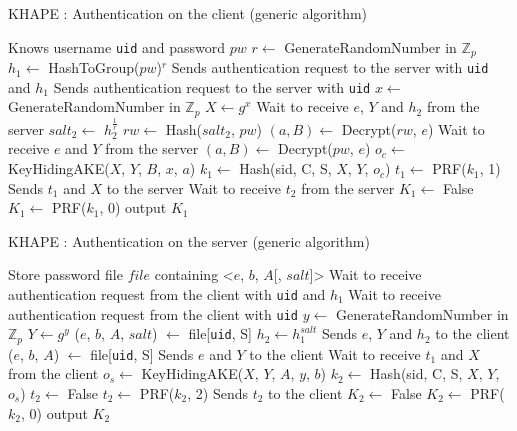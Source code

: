 ﻿\documentclass[../report.tex]{subfiles}
\begin{document}
\begin{algorithm}[h]
\caption{KHAPE : Authentication on the client (generic algorithm)}
\label{alg:login_client}
\begin{algorithmic}
\Require Knows username \verb|uid| and password $pw$
    \State $r \gets$ GenerateRandomNumber in $\mathbb{Z}_p$
    \State $h_1 \gets$ HashToGroup($pw$)$^r$
    \State Sends authentication request to the server with \verb|uid| and $h_1$
\Else
    \State Sends authentication request to the server with \verb|uid|
\EndIf
\State $x \gets$ GenerateRandomNumber in $\mathbb{Z}_p$
\State $X \gets g^x$
    \State Wait to receive $e$, $Y$ and $h_2$ from the server
    \State $salt_2 \gets$ $h_2^{\frac{1}{r}}$
    \State $rw \gets$ Hash($salt_2$, $pw$)
    \State $(a, B) \gets$ Decrypt($rw$, $e$)
\Else
    \State Wait to receive $e$ and $Y$ from the server
    \State $(a, B) \gets$ Decrypt($pw$, $e$)
\EndIf
\State $o_c \gets$ KeyHidingAKE($X$, $Y$, $B$, $x$, $a$)
\State $k_1 \gets$ Hash(sid, C, S, $X$, $Y$, $o_c$)
\State $t_1 \gets$ PRF($k_1$, 1)
\State Sends $t_1$ and $X$ to the server
\State Wait to receive $t_2$ from the server
    \State $K_1 \gets$ False
\Else
    \State $K_1 \gets$ PRF($k_1$, 0)
\EndIf
\State output $K_1$
\end{algorithmic}
\end{algorithm}
\begin{algorithm}
\caption{KHAPE : Authentication on the server (generic algorithm)}
\label{alg:login_server}
\begin{algorithmic}
\Require Store password file $file$ containing <$e$, $b$, $A$[, $salt$]>
    \State Wait to receive authentication request from the client with \verb|uid| and $h_1$
\Else
    \State Wait to receive authentication request from the client with \verb|uid|
\EndIf
\State $y \gets$ GenerateRandomNumber in $\mathbb{Z}_p$
\State $Y \gets g^y$
    \State ($e$, $b$, $A$, $salt$) $\gets$ file[\verb|uid|, S] %
    \State $h_2 \gets h_1^{salt}$
    \State Sends $e$, $Y$ and $h_2$ to the client
\Else
    \State ($e$, $b$, $A$) $\gets$ file[\verb|uid|, S] %
    \State Sends $e$ and $Y$ to the client
\EndIf
\State Wait to receive $t_1$ and $X$ from the client
\State $o_s \gets$ KeyHidingAKE($X$, $Y$, $A$, $y$, $b$)
\State $k_2 \gets$ Hash(sid, C, S, $X$, $Y$, $o_s$)
    \State $t_2 \gets$ False
\Else
    \State $t_2 \gets$ PRF($k_2$, 2)
\EndIf
\State Sends $t_2$ to the client
    \State $K_2 \gets$ False
\Else
    \State $K_2 \gets$ PRF($k_2$, 0)
\EndIf
\State output $K_2$
\end{algorithmic}
\end{algorithm}
\end{document}
